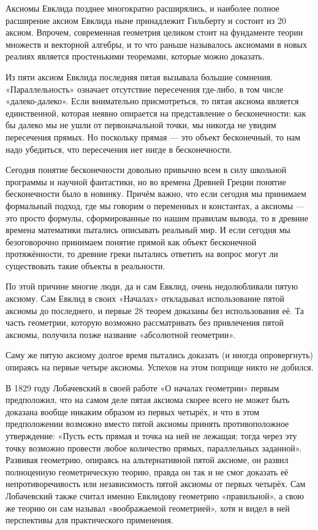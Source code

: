 Аксиомы Евклида позднее многократно расширялись, и наиболее полное расширение аксиом Евклида ныне принадлежит Гильберту и состоит из 20 аксиом. Впрочем, современная геометрия целиком стоит на фундаменте теории множеств и векторной алгебры, и то что раньше называлось аксиомами в новых реалиях является простенькими теоремами, которые можно доказать.

Из пяти аксиом Евклида последняя пятая вызывала большие сомнения. «Параллельность» означает отсутствие пересечения где-либо, в том числе «далеко-далеко». Если внимательно присмотреться, то пятая аксиома является единственной, которая неявно опирается на представление о бесконечности: как бы далеко мы не ушли от первоначальной точки, мы никогда не увидим пересечения прямых. Но поскольку прямая — это объект бесконечный, то нам надо убедиться, что пересечения нет нигде в бесконечности.

Сегодня понятие бесконечности довольно привычно всем в силу школьной программы и научной фантастики, но во времена Древней Греции понятие бесконечности было в новинку. Причём важно, что если сегодня мы принимаем формальный подход, где мы говорим о переменных и константах, а аксиомы — это просто формулы, сформированные по нашим правилам вывода, то в древние времена математики пытались описывать реальный мир. И если сегодня мы безоговорочно принимаем понятие прямой как объект бесконечной протяжённости, то древние греки пытались ответить на вопрос могут ли существовать такие объекты в реальности.

По этой причине многие люди, да и сам Евклид, очень недолюбливали пятую аксиому. Сам Евклид в своих «Началах» откладывал использование пятой аксиомы до последнего, и первые 28 теорем доказаны без использования её. Та часть геометрии, которую возможно рассматривать без привлечения пятой аксиомы, получила позже название «абсолютной геометрии».

Саму же пятую аксиому долгое время пытались доказать (и иногда опровергнуть) опираясь на первые четыре аксиомы. Успехов на этом поприще никто не добился.

В 1829 году Лобачевский в своей работе «О началах геометрии» первым предположил, что на самом деле пятая аксиома скорее всего не может быть доказана вообще никаким образом из первых четырёх, и что в этом предположении возможно вместо пятой аксиомы принять противоположное утверждение: «Пусть есть прямая и точка на ней не лежащая; тогда через эту точку возможно провести любое количество прямых, параллельных заданной». Развивая геометрию, опираясь на альтернативной пятой аксиоме, он развил полноценную геометрическую теорию, правда он так и не смог доказать её непротиворечивость или независимость пятой аксиомы от первых четырёх. Сам Лобачевский также считал именно Евклидову геометрию «правильной», а свою же теорию он сам называл «воображаемой геометрией», хотя и видел в ней перспективы для практического применения.

